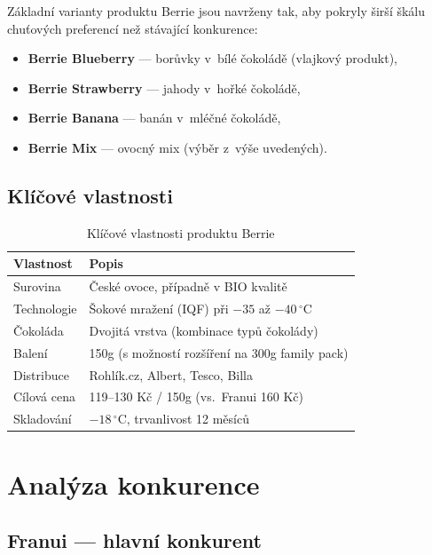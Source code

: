 Základní varianty produktu Berrie jsou navrženy tak, aby pokryly širší škálu chuťových preferencí než stávající konkurence:
\begin{itemize}
  \item \textbf{Berrie Blueberry} — borůvky v~bílé čokoládě (vlajkový produkt),
  \item \textbf{Berrie Strawberry} — jahody v~hořké čokoládě,
  \item \textbf{Berrie Banana} — banán v~mléčné čokoládě,
  \item \textbf{Berrie Mix} — ovocný mix (výběr z~výše uvedených).
\end{itemize}

\subsection{Klíčové vlastnosti}

\begin{table}[H]
\centering
\caption{Klíčové vlastnosti produktu Berrie}
\label{tab:product_features}
\begin{tabularx}{\textwidth}{lX}
\toprule
\textbf{Vlastnost} & \textbf{Popis} \\
\midrule
Surovina & České ovoce, případně v BIO kvalitě \\
Technologie & Šokové mražení (IQF) při $-35$ až $-40\,^{\circ}\mathrm{C}$ \\
Čokoláda & Dvojitá vrstva (kombinace typů čokolády) \\
Balení & 150g (s možností rozšíření na 300g family pack) \\
Distribuce & Rohlík.cz, Albert, Tesco, Billa \\
Cílová cena & 119--130 Kč / 150g (vs.\ Franui 160 Kč) \\
Skladování & $-18\,^{\circ}\mathrm{C}$, trvanlivost 12 měsíců \\
\bottomrule
\end{tabularx}
\end{table}

\section{Analýza konkurence}
\label{sec:res_competition}

\subsection{Franui — hlavní konkurent}

